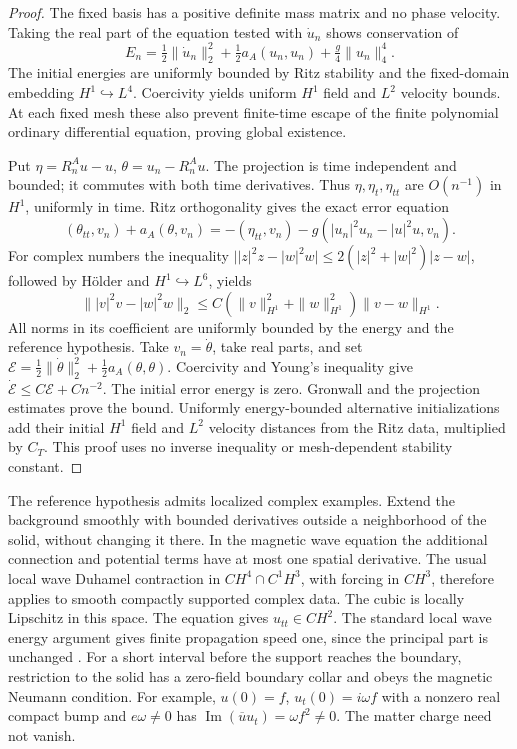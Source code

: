 \begin{proof}
The fixed basis has a positive definite mass matrix and no phase velocity.
Taking the real part of the equation tested with \(\dot u_n\)
shows conservation of
\[
 E_n=\tfrac12\|\dot u_n\|_2^2+\tfrac12a_A(u_n,u_n)
                       +\tfrac g4\|u_n\|_4^4.
\]
The initial energies are uniformly bounded by Ritz stability and the
fixed-domain embedding \(H^1\hookrightarrow L^4\).
Coercivity yields uniform \(H^1\) field and \(L^2\) velocity
bounds. At each fixed mesh these also prevent finite-time escape of the
finite polynomial ordinary differential equation, proving global existence.

Put \(\eta=R_n^Au-u\), \(\theta=u_n-R_n^Au\).
The projection is time independent and bounded; it commutes with both
time derivatives. Thus \(\eta,\eta_t,\eta_{tt}\) are
\(O(n^{-1})\) in \(H^1\), uniformly in time. Ritz
orthogonality gives the exact error equation
\[
 (\theta_{tt},v_n)+a_A(\theta,v_n)
 =-(\eta_{tt},v_n)-g(|u_n|^2u_n-|u|^2u,v_n).
\]
For complex numbers the inequality
\(\bigl||z|^2z-|w|^2w\bigr|
\leq 2(|z|^2+|w|^2)|z-w|\), followed by H\"older and
\(H^1\hookrightarrow L^6\), yields
\[
 \||v|^2v-|w|^2w\|_2
 \leq C(\|v\|_{H^1}^2+\|w\|_{H^1}^2)\|v-w\|_{H^1}.
\]
All norms in its coefficient are uniformly bounded by the energy and
the reference hypothesis. Take \(v_n=\dot\theta\), take real
parts, and set
\(\mathcal E=\tfrac12\|\dot\theta\|_2^2+\tfrac12a_A(\theta,\theta)\).
Coercivity and Young's inequality give
\(\dot{\mathcal E}\leq C\mathcal E+Cn^{-2}\).
The initial error energy is zero. Gronwall and the projection estimates
prove the bound. Uniformly energy-bounded alternative initializations
add their initial \(H^1\) field and \(L^2\) velocity distances
from the Ritz data, multiplied by \(C_T\). This proof uses no
inverse inequality or mesh-dependent stability constant.
\end{proof}

The reference hypothesis admits localized complex examples. Extend the
background smoothly with bounded derivatives outside a neighborhood of
the solid, without changing it there. In the magnetic wave equation the
additional connection and potential terms have at most one spatial
derivative. The usual local wave Duhamel contraction in
\(C H^4\cap C^1H^3\), with forcing in \(C H^3\), therefore
applies to smooth compactly supported complex data. The cubic is locally
Lipschitz in this space. The equation gives \(u_{tt}\in C H^2\).
The standard local wave energy argument gives finite propagation speed
one, since the principal part is unchanged \cite{TaoNonlinearWaves}.
For a short interval before the support reaches the boundary, restriction
to the solid has a zero-field boundary collar and obeys the magnetic
Neumann condition. For example, \(u(0)=f\), \(u_t(0)=i\omega f\)
with a nonzero real compact bump and \(e\omega\ne0\) has
\(\operatorname{Im}(\overline u u_t)=\omega f^2\ne0\).
The matter charge need not vanish.

